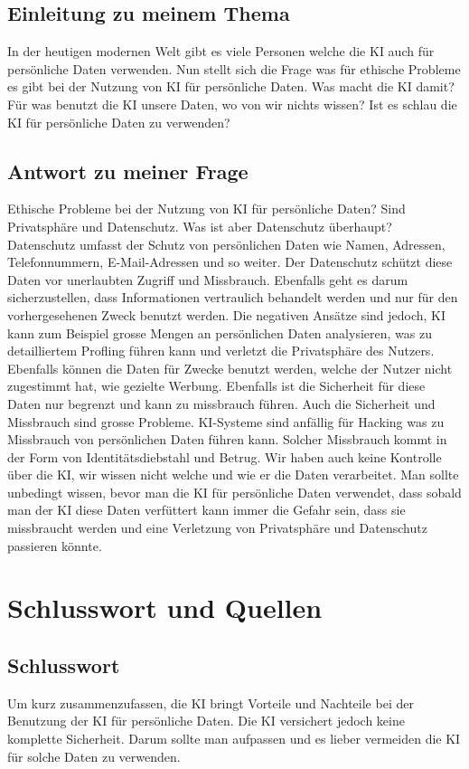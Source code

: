\documentclass{report}
\begin{document}
\section{Einleitung zu meinem Thema}
In der heutigen modernen Welt gibt es viele Personen welche die KI auch
für persönliche Daten verwenden. Nun stellt sich die Frage was für ethische Probleme es gibt bei der Nutzung von KI für persönliche Daten. Was
macht die KI damit? Für was benutzt die KI unsere Daten, wo von wir
nichts wissen? Ist es schlau die KI für persönliche Daten zu verwenden?

\section{Antwort zu meiner Frage}
Ethische Probleme bei der Nutzung von KI für persönliche Daten? Sind
Privatsphäre und Datenschutz. Was ist aber Datenschutz überhaupt? Datenschutz umfasst der Schutz von persönlichen Daten wie Namen, Adressen, Telefonnummern, E-Mail-Adressen und so weiter. Der Datenschutz
schützt diese Daten vor unerlaubten Zugriff und Missbrauch. Ebenfalls
geht es darum sicherzustellen, dass Informationen vertraulich behandelt
werden und nur für den vorhergesehenen Zweck benutzt werden. Die negativen Ansätze sind jedoch, KI kann zum Beispiel grosse Mengen an persönlichen Daten analysieren, was zu detailliertem Profling führen kann
und verletzt die Privatsphäre des Nutzers. Ebenfalls können die Daten für
Zwecke benutzt werden, welche der Nutzer nicht zugestimmt hat, wie gezielte Werbung. Ebenfalls ist die Sicherheit für diese Daten nur begrenzt
und kann zu missbrauch führen. Auch die Sicherheit und Missbrauch sind
grosse Probleme. KI-Systeme sind anfällig für Hacking was zu Missbrauch
von persönlichen Daten führen kann. Solcher Missbrauch kommt in der
Form von Identitätsdiebstahl und Betrug. Wir haben auch keine Kontrolle über die KI, wir wissen nicht welche und wie er die Daten verarbeitet.
Man sollte unbedingt wissen, bevor man die KI für persönliche Daten
verwendet, dass sobald man der KI diese Daten verfüttert kann immer die
Gefahr sein, dass sie missbraucht werden und eine Verletzung von Privatsphäre und Datenschutz passieren könnte.

\chapter{Schlusswort und Quellen}

\section{Schlusswort}
Um kurz zusammenzufassen, die KI bringt Vorteile und Nachteile bei der Benutzung der KI für persönliche Daten. Die KI versichert jedoch keine komplette Sicherheit. Darum sollte man aufpassen und es lieber vermeiden die KI für solche Daten zu verwenden.
\end{document}
